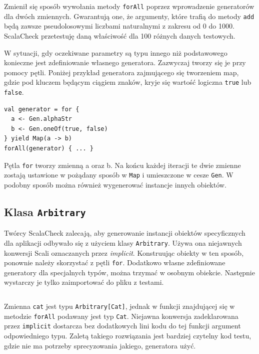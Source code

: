 \documentclass[brudnopis]{xmgr}
\begin{document}
\inputminted[fontsize=\small]{scala}{code/CalcTestOk.scala}

Zmienił się sposób wywołania metody \texttt{forAll} poprzez wprowadzenie generatorów dla dwóch zmiennych. Gwarantują one, że argumenty, które trafią do metody \texttt{add} będą zawsze pseudolosowymi liczbami naturalnymi z zakresu od 0 do 1000. ScalaCheck przetestuję daną właściwość dla 100 różnych danych testowych. 

W sytuacji, gdy oczekiwane parametry są typu innego niż podstawowego konieczne jest zdefiniowanie własnego generatora. Zazwyczaj tworzy się je przy pomocy pętli. Poniżej przykład generatora zajmującego się tworzeniem map, gdzie pod kluczem będącym ciągiem znaków, kryje się wartość logiczna \texttt{true} lub \texttt{false}.

\begin{verbatim}
val generator = for {
  a <- Gen.alphaStr  
  b <- Gen.oneOf(true, false)
} yield Map(a -> b)
forAll(generator) { ... }
\end{verbatim}

Pętla \texttt{for} tworzy zmienną a oraz b. Na końcu każdej iteracji te dwie zmienne zostają ustawione w pożądany sposób w \texttt{Map} i umieszczone w cesze \texttt{Gen}. W podobny sposób można również wygenerować instancje innych obiektów. 

\subsection{Klasa \texttt{Arbitrary}}

Twórcy ScalaCheck zalecają, aby generowanie instancji obiektów specyficznych dla aplikacji odbywało się z użyciem klasy \texttt{Arbitrary}. Używa ona niejawnych konwersji Scali oznaczanych przez \emph{implicit}. Konstruując obiekty w ten sposób, ponownie należy skorzystać z pętli \texttt{for}. Dodatkowo własne zdefiniowane generatory dla specjalnych typów, można trzymać w osobnym obiekcie. Następnie wystarczy je tylko zaimportować do pliku z testami.

\inputminted[fontsize=\small]{scala}{code/CatTestArbitrary.scala}

Zmienna \texttt{cat} jest typu \texttt{Arbitrary[Cat]}, jednak w funkcji znajdującej się w metodzie \texttt{forAll} podawany jest typ \texttt{Cat}. Niejawna konwersja zadeklarowana przez \texttt{implicit} dostarcza bez dodatkowych lini kodu do tej funkcji argument odpowiedniego typu. Zaletą takiego rozwiązania jest bardziej czytelny kod testu, gdzie nie ma potrzeby sprecyzowania jakiego, generatora użyć.
\end{document}
